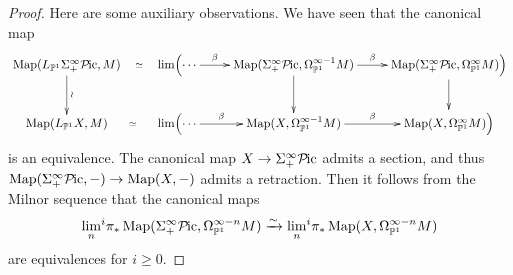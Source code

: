 \documentclass{amsart}
\theoremstyle{plain}
\theoremstyle{definition}
\theoremstyle{remark}
\numberwithin{equation}{theorem}
\newcommand{\mbb}[1]{\mathbb{#1}}
\newcommand{\OmegaP}{\Omega_{\mathbb{P}^1}}
\newcommand{\Pic}{{\mathcal{P}\mspace{-2.0mu}\mathrm{ic}}}
\newcommand{\Map}{\operatorname{Map}}
\begin{document}
\begin{proof}
Here are some auxiliary observations.
We have seen that the canonical map
\[
\xymatrix{
	\Map(L_{\mbb{P}^1}\Sigma^\infty_+\Pic,M) \ar@{}[r]|-\simeq \ar[d]^\wr & \lim\Bigl(\cdots \ar[r]^-\beta &
		\Map(\Sigma^\infty_+\Pic,\OmegaP^{\infty-1}M) \ar[r]^-\beta \ar[d] & \Map(\Sigma^\infty_+\Pic,\OmegaP^\infty M)\Bigr) \ar[d] \\
	\Map(L_{\mbb{P}^1}X,M) \ar@{}[r]|-\simeq & \lim\Bigl(\cdots \ar[r]^-\beta &
		\Map(X,\OmegaP^{\infty-1}M) \ar[r]^-\beta & \Map(X,\OmegaP^\infty M)\Bigr)
}
\]
is an equivalence.
The canonical map $X\to\Sigma^\infty_+\Pic$ admits a section, and thus $\Map(\Sigma^\infty_+\Pic,-)\to\Map(X,-)$ admits a retraction.
Then it follows from the Milnor sequence that the canonical maps
\[
	\lim_n\!{}^i\pi_*\Map(\Sigma^\infty_+\Pic,\OmegaP^{\infty-n}M) \xrightarrow{\sim} \lim_n\!{}^i\pi_*\Map(X,\OmegaP^{\infty-n}M)
\]
are equivalences for $i\ge 0$.


\end{proof}
\end{document}
